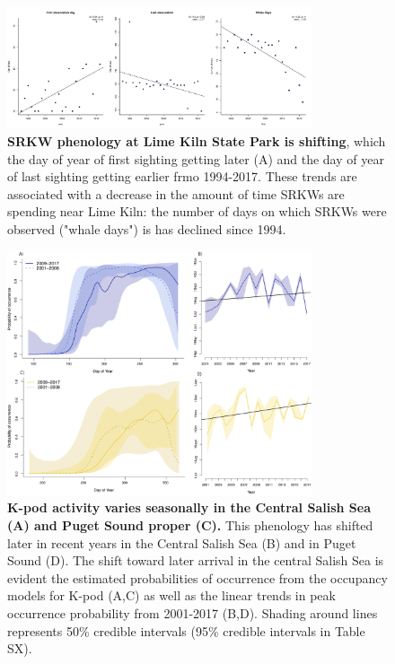 \documentclass{article}
\begin{document}
\begin{figure}[p]
\includegraphics[width=0.8\textwidth]{../analyses/orcaphen/figures/limekilntrends_dat.pdf} 
\caption{\textbf{SRKW phenology at Lime Kiln State Park is shifting}, which the day of year of first sighting getting later (A) and the day of year of last sighting getting earlier frmo 1994-2017. These trends are associated with a decrease in the amount of time SRKWs are spending near Lime Kiln: the number of days on which SRKWs were observed ("whale days") is has declined since 1994. }
\label{fig:limetime}
\end{figure}

\begin{figure}[p]
\includegraphics[width=0.8\textwidth]{../analyses/figures/proboccK_4panels.png} 
\caption{\textbf{K-pod activity varies seasonally in the Central Salish Sea (A) and Puget Sound proper (C).} This phenology has shifted later in recent years in the Central Salish Sea (B) and in Puget Sound (D). The shift toward later arrival in the central Salish Sea is evident the estimated probabilities of occurrence from the occupancy models for K-pod (A,C) as well as the linear trends in peak occurrence probability from 2001-2017 (B,D). Shading around lines represents 50\% credible intervals (95\% credible intervals in Table SX). 
}
\label{fig:Kprobs}
\end{figure}
\end{document}
